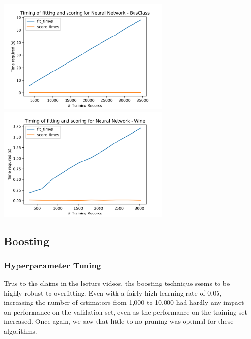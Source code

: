 \documentclass[
	letterpaper, %
]{jdf}
\begin{document}
\includegraphics[width=3.4in]{Figures/BusClass-0920/NN/time_curve.png}
\includegraphics[width=3.4in]{Figures/Wine-0921/NN/time_curve.png}


\subsection{Boosting}

\subsubsection{Hyperparameter Tuning}
True to the claims in the lecture videos, the boosting technique seems to be highly robust to overfitting. Even with a fairly high learning rate of 0.05, increasing the number of estimators from 1,000 to 10,000 had hardly any impact on performance on the validation set, even as the performance on the training set increased. Once again, we saw that little to no pruning was optimal for these algorithms.
\end{document}
